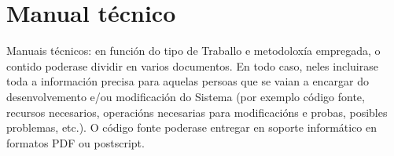 \chapter{Manual técnico}

Manuais técnicos: en función do tipo de Traballo e metodoloxía empregada, o contido poderase dividir en varios documentos. En todo caso, neles incluirase toda a información precisa para aquelas persoas que se vaian a encargar do desenvolvemento e/ou modificación do Sistema (por exemplo código fonte, recursos necesarios, operacións necesarias para modificacións e probas, posibles problemas, etc.). O código fonte poderase entregar en soporte informático en formatos PDF ou postscript.
